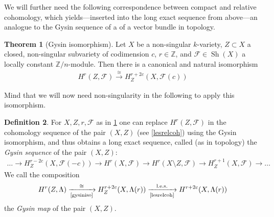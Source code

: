 \documentclass[english]{scrartcl}
\theoremstyle{definition}
\newtheorem{Def}{Definition}[section]
\newtheorem{Thm}[Def]{Theorem}
\theoremstyle{remark}
\newcommand*{\Z}{\mathds{Z}}
\newcommand*{\Zmod}[1]{\Z/#1} %
\newcommand*{\F}{\mathcal{F}} %
\DeclareMathOperator{\Sh}{Sh} %
\begin{document}
We will further need the following correspondence between compact and
relative cohomology, which yields---inserted into the long exact
sequence from above---an analogue to the Gysin sequence of a of a
vector bundle in topology.
\begin{Thm}[Gysin isomorphism]\label{gysiniso}
  Let $X$ be a non-singular $k$-variety,
  $Z\subset X$ a closed, non-singular subvariety of codimension $c$,
  $r\in\Z$,
  and $\F\in\Sh(X)$ a locally constant $\Zmod{n}$-module.
  Then there is a canonical and natural isomorphism
  \begin{gather*}
    H^{r}\left(Z,\F\right)
    \xrightarrow{\cong}
    H_Z^{r+2c}\left(X,\F(c)\right)
  \end{gather*}    
\end{Thm}
Mind that we will now need non-singularity in the following to apply
this isomorphism.
\begin{Def}
  For $X,Z,r,\F$ as in \ref{gysiniso} one can replace
  $H^{r}(Z,\F)$ in the cohomology sequence of the pair
  $(X,Z)$ (see \ref{lesrelcoh}) using the Gysin isomorphism, and thus
  obtains a long exact sequence, called (as in topology) the
  \emph{Gysin sequence} of the pair $(X,Z)$:
  \begin{gather*}
    \dotsc
    \to H_Z^{r-2c}\left(X,\F(-c)\right)
    \to H^r(X,\F)
    \to H^r(X\setminus Z,\F)
    \to H_Z^{r+1}(X,\F)
    \to \dotsc    
  \end{gather*}
  We call the composition
  \begin{gather*}
    H^r(Z,\Lambda)
    \xrightarrow[\text{\ref{gysiniso}}]{\cong}
    H_Z^{r+2c}(X,\Lambda(r))
    \xrightarrow[\text{\ref{lesrelcoh}}]{\text{l.e.s.}}
    H^{r+2c}(X,\Lambda(r))
  \end{gather*}
  the \emph{Gysin map} of the pair $(X,Z)$.
\end{Def}
\end{document}
